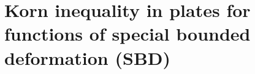 \chapter{Korn inequality in plates for functions of special bounded deformation (SBD)}
\label{chap:KornSBD}
\begin{comment}
\section{Papers}
\begin{com}
    Ignore this part( 5 pages), Just papers for me to look into when writing the introduction.
\end{com}
\subsection{Fracture Mechanics}
\begin{enumerate}
       \item \sout{Important-- Francfort G.A., Marigo J.-J.: Revisiting brittle fracture as an energy minimization problem. J. Mech.
Phys. Solids 46 (1998), 1319-1342. Not useful... But need to look for more papers in Fracture Mechanics in general}
\begin{itemize}
\item Fonseca I and Francfort G A 0884 Relaxation in BV versus quasiconvexication in $W_0^p$
a model for the interaction between fracture and damage Calculus of Variations 23 396
\end{itemize}
\item Bourdin B., Francfort G.A., Marigo J.J.: The variational approach to fracture. J. Elasticity 91 (2008),
5-148
\bl{Not a bad book to get some intuition on grifith theory, but not the best. It has the variational problems of fracture mechanics though. However, they just use SBV or GSBV}
\item Babadjian, J.-F., Iurlano, F., Lemenant, A.: Partial regularity for the crack set minimizing the twodimensional Griffith energy. Accepted for publication. J. Eur. Math. Soc. arXiv:1905.10298
\item Babadjian, J.-F., Giacomini, A.: Existence of strong solutions for quasi-static evolution in brittle fracture.
Ann. Sc. Norm. Super. Pisa Cl. Sci. (5) 13, 925–974 (2014)
\item Chambolle, A., Crismale, V.: Existence of strong solutions to the Dirichlet problem for the Griffith energy. Calc. Var. Partial Differ. Equ. 58(136) (2019)\bl{ Somewhat useful introduction, some Pde Regularity results on the Appendix}

\end{comment}

